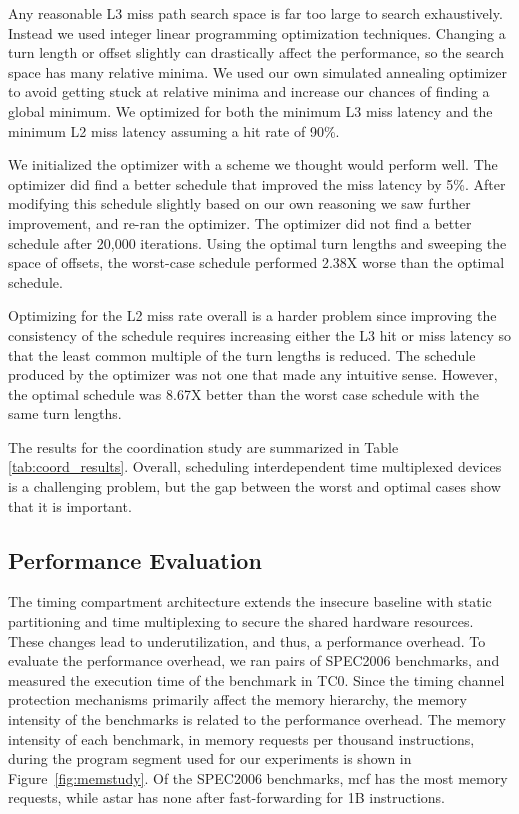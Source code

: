 Any reasonable L3 miss path search space is far too large to search 
exhaustively. Instead we used integer linear programming optimization 
techniques. Changing a turn length or offset slightly can drastically affect 
the performance, so the search space has many relative minima. We used 
our own simulated annealing optimizer to avoid getting stuck at relative minima 
and increase our chances of finding a global minimum. We optimized for both the 
minimum L3 miss latency and the minimum L2 miss latency assuming a hit rate of 
90\%. 

We initialized the optimizer with a scheme we thought would perform well. The 
optimizer did find a better schedule that improved the miss latency by 5\%. 
After modifying this schedule slightly based on our own reasoning we saw 
further improvement, and re-ran the optimizer. The optimizer did not find a 
better schedule after 20,000 iterations. Using the optimal turn lengths and 
sweeping the space of offsets, the worst-case schedule performed 2.38X worse 
than the optimal schedule.

Optimizing for the L2 miss rate overall is a harder problem since improving the 
consistency of the schedule requires increasing either the L3 hit or miss 
latency so that the least common multiple of the turn lengths is reduced. The 
schedule produced by the optimizer was not one that made any intuitive sense. 
However, the optimal schedule was 8.67X better than the worst case schedule 
with the same turn lengths.

The results for the coordination study are summarized in Table 
\ref{tab:coord_results}. Overall, scheduling 
interdependent time multiplexed devices is a challenging problem, but the gap 
between the worst and optimal cases show that it is important.

\subsection{Performance Evaluation}

The timing compartment architecture extends the insecure baseline with
static partitioning and time multiplexing to secure the shared hardware 
resources. These changes lead to underutilization, and thus, a performance
overhead. To evaluate the performance overhead, we ran pairs of
SPEC2006 benchmarks, and measured the execution time of the benchmark
in TC0. Since the timing channel protection mechanisms primarily affect the memory 
hierarchy, the memory intensity of the benchmarks is related to the performance 
overhead.
The memory intensity of each benchmark, in memory requests per thousand 
instructions, during the program segment used for our experiments is shown in
Figure~\ref{fig:memstudy}. Of the SPEC2006 benchmarks, mcf has the most memory 
requests, while astar has none after fast-forwarding for 1B instructions.

